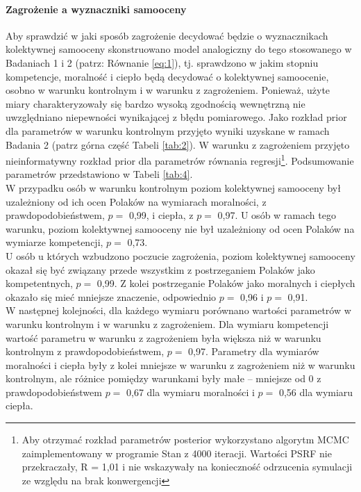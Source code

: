 \documentclass[man]{apa6}
\begin{document}
\paragraph{Zagrożenie a wyznaczniki samooceny}
Aby sprawdzić w jaki sposób zagrożenie decydować będzie o wyznacznikach kolektywnej samooceny skonstruowano model analogiczny do tego stosowanego w Badaniach 1 i 2 (patrz: Równanie \ref{eq:1}), tj. sprawdzono w jakim stopniu kompetencje, moralność i ciepło będą decydować o kolektywnej samoocenie, osobno w warunku kontrolnym i w warunku z zagrożeniem. Ponieważ, użyte miary charakteryzowały się bardzo wysoką zgodnością wewnętrzną nie uwzględniano niepewności wynikającej z błędu pomiarowego. Jako rozkład prior dla parametrów w warunku kontrolnym przyjęto wyniki uzyskane w ramach Badania 2 (patrz górna część Tabeli \ref{tab:2}). W warunku z zagrożeniem przyjęto nieinformatywny rozkład prior dla parametrów równania regresji\footnote{Aby otrzymać rozkład parametrów posterior wykorzystano algorytm MCMC zaimplementowany w programie Stan z 4000 iteracji. Wartości PSRF nie przekraczały, R = 1,01 i nie wskazywały na konieczność odrzucenia symulacji ze względu na brak konwergencji}. Podsumowanie parametrów przedstawiono w Tabeli \ref{tab:4}. \\

W przypadku osób w warunku kontrolnym poziom kolektywnej samooceny był uzależniony od ich ocen Polaków na wymiarach moralności, z prawdopodobieństwem, $p =$ 0,99, i ciepła, z $p =$ 0,97. U osób w ramach tego warunku, poziom kolektywnej samooceny nie był uzależniony od ocen Polaków na wymiarze kompetencji, $p =$ 0,73. \\

U osób u których wzbudzono poczucie zagrożenia, poziom kolektywnej samooceny okazał się być związany przede wszystkim z postrzeganiem Polaków jako kompetentnych, $p =$ 0,99. Z kolei postrzeganie Polaków jako moralnych i ciepłych okazało się mieć mniejsze znaczenie, odpowiednio $p =$ 0,96 i $p =$ 0,91.\\

W następnej kolejności, dla każdego wymiaru porównano wartości parametrów w warunku kontrolnym i w warunku z zagrożeniem. Dla wymiaru kompetencji wartość parametru w warunku z zagrożeniem była większa niż w warunku kontrolnym z prawdopodobieństwem, $p =$ 0,97. Parametry dla wymiarów moralności i ciepła były z kolei mniejsze w warunku z zagrożeniem niż w warunku kontrolnym, ale różnice pomiędzy warunkami były małe -- mniejsze od 0 z prawdopodobieństwem $p = $ 0,67 dla wymiaru moralności i $p =$ 0,56 dla wymiaru ciepła.\\
\end{document}
